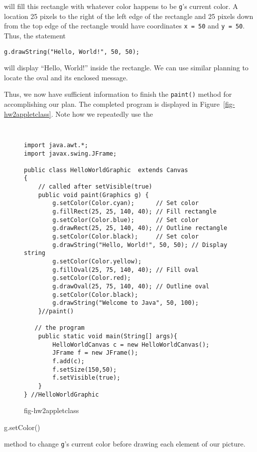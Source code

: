 \noindent will fill this rectangle with whatever color happens to
be {\tt g}'s current color.  A location 25 pixels to the right of the
left edge of the rectangle and 25 pixels down from the top 
edge of the rectangle would have coordinates \mbox{\tt x = 50} and
\mbox{\tt y = 50}.  Thus, the statement

\begin{jjjlisting}
\begin{lstlisting}
g.drawString("Hello, World!", 50, 50);
\end{lstlisting}
\end{jjjlisting}

\noindent will display ``Hello, World!'' inside the rectangle. We can
use similar planning to locate the oval and its enclosed message.

Thus, we now have sufficient information to finish the {\tt paint()}
method for accomplishing our plan.  The completed program is displayed
in Figure~\ref{fig-hw2appletclass}. Note how we repeatedly use the {\tt
\begin{figure}[!htb]
\jjjprogstart
\begin{jjjlisting}
\begin{lstlisting}
import java.awt.*;
import javax.swing.JFrame;

public class HelloWorldGraphic  extends Canvas 
{ 
    // called after setVisible(true)
    public void paint(Graphics g) { 
        g.setColor(Color.cyan);      // Set color
        g.fillRect(25, 25, 140, 40); // Fill rectangle
        g.setColor(Color.blue);      // Set color
        g.drawRect(25, 25, 140, 40); // Outline rectangle
        g.setColor(Color.black);     // Set color
        g.drawString("Hello, World!", 50, 50); // Display string
        g.setColor(Color.yellow);          
        g.fillOval(25, 75, 140, 40); // Fill oval
        g.setColor(Color.red);
        g.drawOval(25, 75, 140, 40); // Outline oval
        g.setColor(Color.black);
        g.drawString("Welcome to Java", 50, 100);
    }//paint()

   // the program
    public static void main(String[] args){
        HelloWorldCanvas c = new HelloWorldCanvas();
        JFrame f = new JFrame();
        f.add(c);
        f.setSize(150,50);
        f.setVisible(true);
    }
} //HelloWorldGraphic
\end{lstlisting}
\end{jjjlisting}
{fig-hw2appletclass}
\end{figure}
g.setColor()} method to change {\tt g}'s current color before drawing
each element of our picture. 

